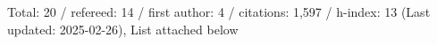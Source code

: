 Total: 20 / refereed: 14 / first author: 4 / citations: 1,597 / h-index: 13 (Last updated: 2025-02-26), List attached below